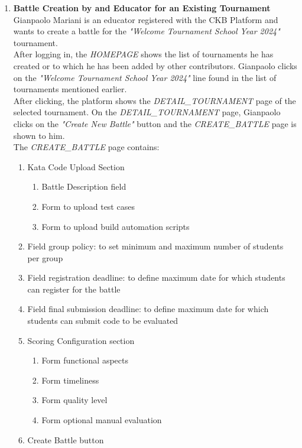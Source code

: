 \begin{enumerate}
    	
    	
    \item \textbf{Battle Creation by and Educator for an Existing Tournament}\\
    	Gianpaolo Mariani is an educator registered with the CKB Platform and wants to create a battle for the \emph{"Welcome Tournament School Year 2024"} tournament.\\
    	After logging in, the \emph{HOMEPAGE} shows the list of tournaments he has created or to which he has been added by other contributors. Gianpaolo clicks on the \emph{"Welcome 
    	Tournament School Year 2024"} line found in the list of tournaments mentioned earlier.\\
    	After clicking, the platform shows the \emph{DETAIL\_TOURNAMENT} page of the selected tournament.
    	On the \emph{DETAIL\_TOURNAMENT} page, Gianpaolo clicks on the \emph{"Create New Battle"} button and the \emph{CREATE\_BATTLE} page is shown to him.\\
    	The \emph{CREATE\_BATTLE} page contains:

		\begin{enumerate}
			\item Kata Code Upload Section
				\begin{enumerate}
					\item Battle Description field
					\item Form to upload test cases
					\item Form to upload build automation scripts
				\end{enumerate}
			\item Field group policy: to set minimum and maximum number of students per group
			\item Field registration deadline: to define maximum date for which students can register for the battle
			\item Field final submission deadline: to define maximum date for which students can submit code to be evaluated
			\item Scoring Configuration section

				\begin{enumerate}
					\item Form functional aspects
					\item Form timeliness
					\item Form quality level
					\item Form optional manual evaluation
				\end{enumerate}

			
			\item Create Battle button
		\end{enumerate}
		

\end{enumerate}
